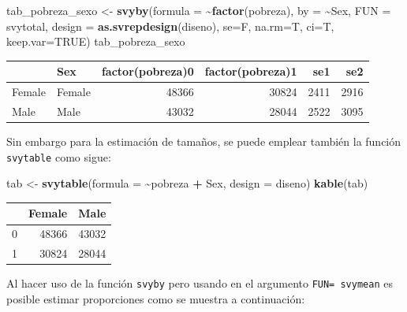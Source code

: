 \documentclass[
  12pt,
]{book}
\newenvironment{Shaded}{\begin{snugshade}}{\end{snugshade}}
\newcommand{\AttributeTok}[1]{\textcolor[rgb]{0.13,0.29,0.53}{#1}}
\newcommand{\ConstantTok}[1]{\textcolor[rgb]{0.56,0.35,0.01}{#1}}
\newcommand{\FunctionTok}[1]{\textcolor[rgb]{0.13,0.29,0.53}{\textbf{#1}}}
\newcommand{\NormalTok}[1]{#1}
\newcommand{\OtherTok}[1]{\textcolor[rgb]{0.56,0.35,0.01}{#1}}
\newcommand{\SpecialCharTok}[1]{\textcolor[rgb]{0.81,0.36,0.00}{\textbf{#1}}}
\begin{document}
\begin{Shaded}
\begin{Highlighting}[]
\NormalTok{tab\_pobreza\_sexo }\OtherTok{\textless{}{-}} \FunctionTok{svyby}\NormalTok{(}\AttributeTok{formula =} \SpecialCharTok{\textasciitilde{}}\FunctionTok{factor}\NormalTok{(pobreza), }
                          \AttributeTok{by =} \SpecialCharTok{\textasciitilde{}}\NormalTok{Sex,}
                          \AttributeTok{FUN =}\NormalTok{ svytotal, }
                          \AttributeTok{design =} \FunctionTok{as.svrepdesign}\NormalTok{(diseno), }
                          \AttributeTok{se=}\NormalTok{F, }\AttributeTok{na.rm=}\NormalTok{T, }\AttributeTok{ci=}\NormalTok{T, }\AttributeTok{keep.var=}\ConstantTok{TRUE}\NormalTok{)}
\NormalTok{tab\_pobreza\_sexo}
\end{Highlighting}
\end{Shaded}

\begin{tabular}{l|l|r|r|r|r}
\hline
  & Sex & factor(pobreza)0 & factor(pobreza)1 & se1 & se2\\
\hline
Female & Female & 48366 & 30824 & 2411 & 2916\\
\hline
Male & Male & 43032 & 28044 & 2522 & 3095\\
\hline
\end{tabular}

Sin embargo para la estimación de tamaños, se puede emplear también la función \texttt{svytable} como sigue:

\begin{Shaded}
\begin{Highlighting}[]
\NormalTok{tab }\OtherTok{\textless{}{-}} \FunctionTok{svytable}\NormalTok{(}\AttributeTok{formula =} \SpecialCharTok{\textasciitilde{}}\NormalTok{pobreza }\SpecialCharTok{+}\NormalTok{ Sex, }\AttributeTok{design =}\NormalTok{ diseno)}
\FunctionTok{kable}\NormalTok{(tab)}
\end{Highlighting}
\end{Shaded}

\begin{tabular}{l|r|r}
\hline
  & Female & Male\\
\hline
0 & 48366 & 43032\\
\hline
1 & 30824 & 28044\\
\hline
\end{tabular}

Al hacer uso de la función \texttt{svyby} pero usando en el argumento \texttt{FUN=\ svymean} es posible estimar proporciones como se muestra a continuación:
\end{document}
